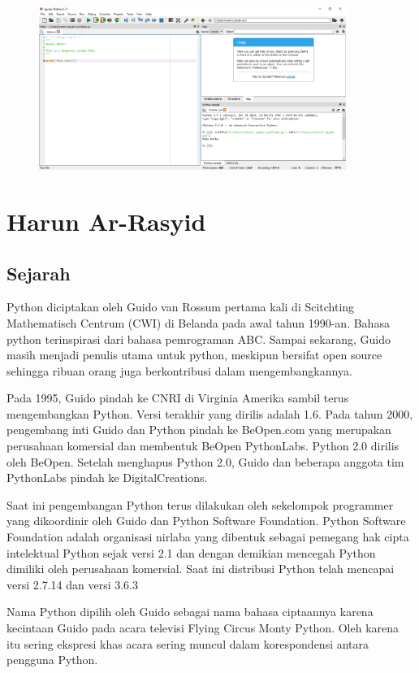 \begin{enumerate}
	\begin{figure}[H]
		\includegraphics[width=10cm]{figures/diva/19chp1diva.png}
		\centering
	\end{figure}
\end{enumerate}


\section{Harun Ar-Rasyid}
\subsection{Sejarah}
Python diciptakan oleh Guido van Rossum pertama kali di Scitchting Mathematisch Centrum (CWI) di Belanda pada awal tahun 1990-an. Bahasa python terinspirasi dari bahasa pemrograman ABC. Sampai sekarang, Guido masih menjadi penulis utama untuk python, meskipun bersifat open source sehingga ribuan orang juga berkontribusi dalam mengembangkannya.

Pada 1995, Guido pindah ke CNRI di Virginia Amerika sambil terus mengembangkan Python. Versi terakhir yang dirilis adalah 1.6. Pada tahun 2000, pengembang inti Guido dan Python pindah ke BeOpen.com yang merupakan perusahaan komersial dan membentuk BeOpen PythonLabs. Python 2.0 dirilis oleh BeOpen. Setelah menghapus Python 2.0, Guido dan beberapa anggota tim PythonLabs pindah ke DigitalCreations.

Saat ini pengembangan Python terus dilakukan oleh sekelompok programmer yang dikoordinir oleh Guido dan Python Software Foundation. Python Software Foundation adalah organisasi nirlaba yang dibentuk sebagai pemegang hak cipta intelektual Python sejak versi 2.1 dan dengan demikian mencegah Python dimiliki oleh perusahaan komersial. Saat ini distribusi Python telah mencapai versi 2.7.14 dan versi 3.6.3

Nama Python dipilih oleh Guido sebagai nama bahasa ciptaannya karena kecintaan Guido pada acara televisi Flying Circus Monty Python. Oleh karena itu sering ekspresi khas acara sering muncul dalam korespondensi antara pengguna Python.
